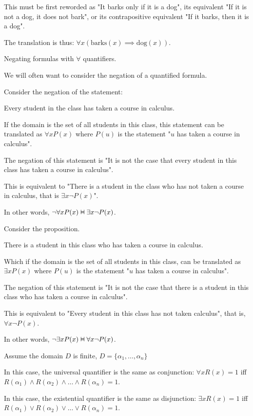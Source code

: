 \documentclass{article}
\newcommand{\vDashv}{%
  \mathrel{%
    \text{%
      \ooalign{$\vDash$\cr\reflectbox{$\vDash$}\cr}%
    }%
  }%
}
\begin{document}
This must be first reworded as "It barks only if it is a dog", its equivalent "If it is not a dog, it does not bark", or its contrapositive equivalent "If it barks, then it is a dog".

The translation is thus: $\forall x (\text{barks}(x) \implies \text{dog}(x))$.

Negating formulas with $\forall$ quantifiers.

We will often want to consider the negation of a quantified formula.

Consider the negation of the statement:

Every student in the class has taken a course in calculus.

If the domain is the set of all students in this class, this statement can be translated as $\forall xP(x)$ where $P(u)$ is the statement "$u$ has taken a course in calculus".

The negation of this statement is "It is not the case that every student in this class has taken a course in calculus".

This is equivalent to "There is a student in the class who has not taken a course in calculus, that is $\exists x \neg P(x)$".

In other words, $\neg \forall x P(x) \vDashv \exists x \neg P(x)$.

Consider the proposition.

There is a student in this class who has taken a course in calculus.

Which if the domain is the set of all students in this class, can be translated as $\exists x P(x)$ where $P(u)$ is the statement "$u$ has taken a course in calculus".

The negation of this statement is "It is not the case that there is a student in this class who has taken a course in calculus". 

This is equivalent to "Every student in this class has not taken calculus", that is, $\forall x \neg P(x)$.

In other words, $\neg \exists x P(x) \vDashv \forall x \neg P(x)$.

Assume the domain $D$ is finite, $D = \{\alpha_1, \ldots, \alpha_n\}$

In this case, the universal quantifier is the same as conjunction: $\forall x R(x) = 1 $ iff $ R(\alpha_1) \wedge R(\alpha_2) \wedge \ldots \wedge R(\alpha_n) = 1$.

In this case, the existential quantifier is the same as disjunction: $\exists x R(x) = 1 $ iff $R(\alpha_1) \vee R(\alpha_2) \vee \ldots \vee R(\alpha_n) = 1$.
\end{document}
